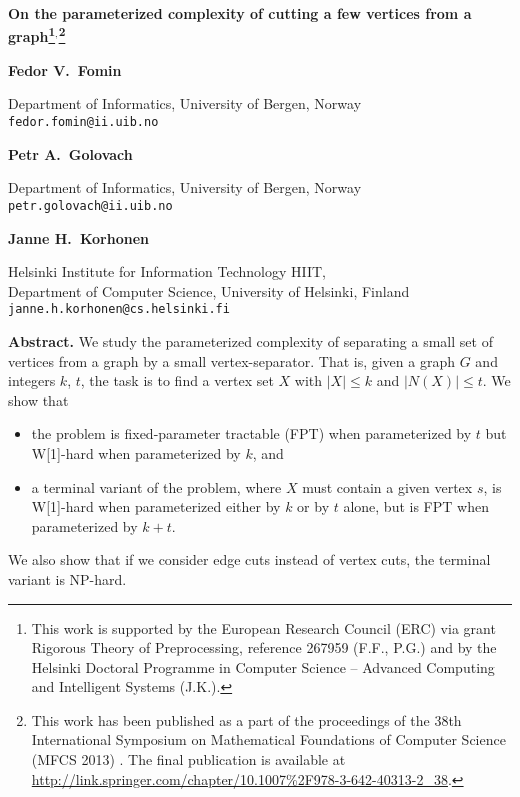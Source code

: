 \documentclass[a4paper,11pt]{article}
\theoremstyle{definition}
\theoremstyle{remark}
\newenvironment{myabstract}
               {\list{}{\listparindent 1.5em\itemindent    \listparindent
                        \leftmargin    0pt
                        \rightmargin   0pt
                        \parsep        0pt}\item\relax}
               {\endlist}
\newenvironment{mycover}
               {\list{}{\listparindent 0pt
                        \itemindent    \listparindent
                        \leftmargin    0pt
                        \rightmargin   0pt
                        \parsep        0pt}\raggedright
                \item\relax}
               {\endlist}
\begin{document}
\vspace*{2ex}
\begin{mycover}
{\LARGE \textbf{On the parameterized complexity of cutting a few vertices from a graph\footnote{This work is supported by the European Research Council (ERC) via grant Rigorous Theory of Preprocessing, reference 267959 (F.F., P.G.) and by the Helsinki Doctoral Programme in Computer Science -- Advanced Computing and Intelligent Systems (J.K.).}${}^,$\footnote{This work has been published as a part of the proceedings of the 38th International Symposium on Mathematical Foundations of Computer Science ({MFCS} 2013) \cite{small-cuts-conf}. The final publication is available at \url{http://link.springer.com/chapter/10.1007\%2F978-3-642-40313-2_38}.}}\par}


\bigskip
\bigskip

\medskip
\textbf{Fedor V.\ Fomin}\\
{\small Department of Informatics, University of Bergen, Norway\\
\nolinkurl{fedor.fomin@ii.uib.no}\par}

\medskip
\textbf{Petr A.\ Golovach}\\
{\small Department of Informatics, University of Bergen, Norway\\
\nolinkurl{petr.golovach@ii.uib.no}\par}

\medskip
\textbf{Janne H.\ Korhonen}\\
{\small Helsinki Institute for Information Technology HIIT, \\
Department of Computer Science, University of Helsinki, Finland\\
\nolinkurl{janne.h.korhonen@cs.helsinki.fi}\par}
\end{mycover}

\bigskip
\bigskip

\begin{myabstract}
\noindent\textbf{Abstract.} We study the parameterized complexity of separating a small set of vertices from a graph by a small vertex-separator. That is, given a graph $G$ and integers $k$, $t$, the task is to find a vertex set $X$ with $|X| \le k$ and $|N(X)| \le t$. We show that
\begin{itemize}
	\item the problem is fixed-parameter tractable (FPT) when parameterized by $t$ but W[1]-hard when parameterized by $k$, and
	\item a terminal variant of the problem, where $X$ must contain a given vertex $s$, is W[1]-hard when parameterized either by $k$ or by $t$ alone, but is FPT when parameterized by $k + t$.  
\end{itemize}
We also show that if we consider edge cuts instead of vertex cuts, the terminal variant is NP-hard.
\end{myabstract}
\end{document}
